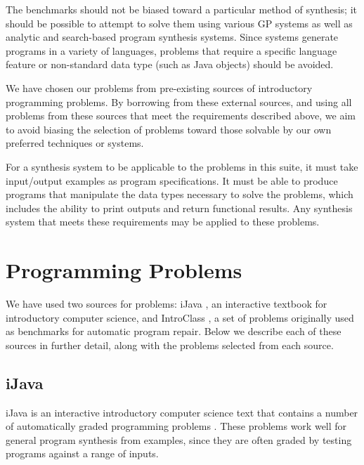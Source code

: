\documentclass{sig-alternate}
\begin{document}
The benchmarks should not be biased toward a particular method of synthesis; it should be possible to attempt to solve them using various GP systems as well as analytic and search-based program synthesis systems. Since systems generate programs in a variety of languages, problems that require a specific language feature or non-standard data type (such as Java objects) should be avoided.

We have chosen our problems from pre-existing sources of introductory programming problems. By borrowing from these external sources, and using all problems from these sources that meet the requirements described above, we aim to avoid biasing the selection of problems toward those solvable by our own preferred techniques or systems.

For a synthesis system to be applicable to the problems in this suite, it must take input/output examples as program specifications. It must be able to produce programs that manipulate the data types necessary to solve the problems, which includes the ability to print outputs and return functional results. Any synthesis system that meets these requirements may be applied to these problems.


\section{Programming Problems} \label{descriptionsSection}

We have used two sources for problems: iJava \cite{iJava}, an interactive textbook for introductory computer science, and IntroClass \cite{ManyBugsAndIntroClass, Brun13TRgptest}, a set of problems originally used as benchmarks for automatic program repair. Below we describe each of these sources in further detail, along with the problems selected from each source.

\subsection{iJava}


iJava is an interactive introductory computer science text that contains a number of automatically graded programming problems \cite{iJava, Moll:2011:IOI:1968521.1968535}. These problems work well for general program synthesis from examples, since they are often graded by testing programs against a range of inputs.
\end{document}
